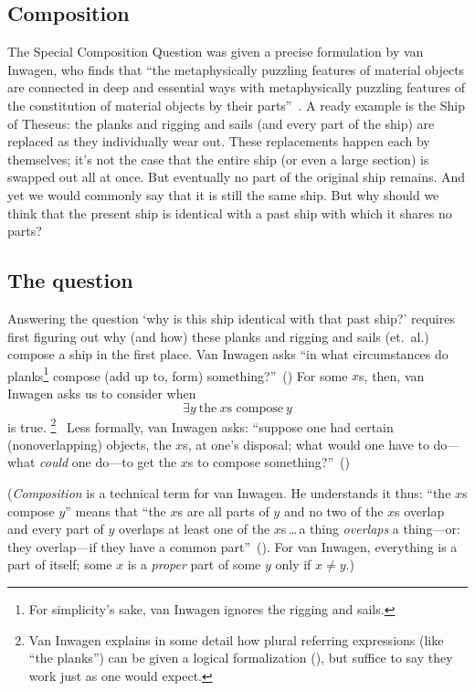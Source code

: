 \documentclass[11pt]{standalone}
\begin{document}
\begin{spacing}{1.5}
\subsection{Composition}
\label{comp}
The Special Composition Question was given a precise formulation by
van Inwagen, who finds that ``the metaphysically puzzling features of
material objects are connected in deep and essential ways with
metaphysically puzzling features of the constitution of material
objects by their parts''~\citep[18]{inwagen1995}.  A ready example is
the Ship of Theseus: the planks and rigging and sails (and every part
of the ship) are replaced as they individually wear out.  These
replacements happen each by themselves; it's not the case that the
entire ship (or even a large section) is swapped out all at once.  But
eventually no part of the original ship remains.  And yet we would
commonly say that it is still the same ship.  But why should we think
that the present ship is identical with a past ship with which it
shares no parts?

\subsection{The question}
\label{scq}
Answering the question `why is this ship identical with that past
ship?' requires first figuring out why (and how) these planks and
rigging and sails (et.\ al.) compose a ship in the first place.  Van
Inwagen asks ``in what circumstances do planks\footnote{For
  simplicity's sake, van Inwagen ignores the rigging and sails.}
compose (add up to, form) something?''~(\citeyear[21]{inwagen1995}) 
For some $x$s, then, van Inwagen asks us to consider when
\begin{equation}
\exists y\ \text{the}\ x\text{s compose}\ y
\end{equation}
is true.%
\footnote{Van Inwagen explains in some detail how plural referring
  expressions (like ``the planks'') can be given a logical
  formalization (\citeyear[23--28]{inwagen1995}), but suffice to say
  they work just as one would expect.}
%
\ Less formally, van Inwagen asks: ``suppose one had certain
(nonoverlapping) objects, the $x$s, at one's disposal; what would one
have to do---what {\em could} one do---to get the $x$s to compose
something?''~(\citeyear[31]{inwagen1995})

({\em Composition} is a technical term for van Inwagen.  He
understands it thus: ``the $x$s compose $y$'' means that ``the $x$s
are all parts of $y$ and no two of the $x$s overlap and every part of
$y$ overlaps at least one of the $x$s\,\ldots\,a thing {\em overlaps}
a thing---or: they overlap---if they have a common
part''~(\citeyear[29]{inwagen1995}).  For van Inwagen, everything is a
part of itself; some $x$ is a {\em proper} part of some $y$ only if $x
\neq y$.)


\end{spacing}
\end{document}
